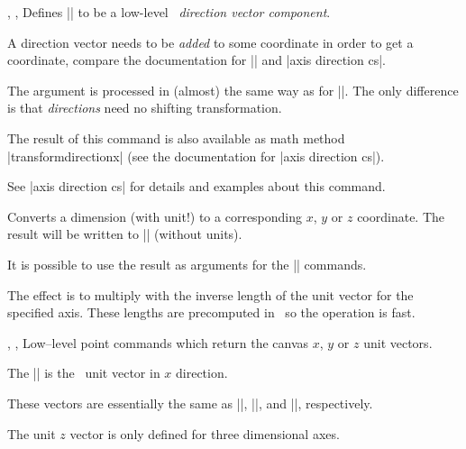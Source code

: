 \begin{commandlist}{%
	\pgfplotstransformdirectionx{},%
	\pgfplotstransformdirectiony{},%
	\pgfplotstransformdirectiony{}}
	Defines |\pgfmathresult| to be a low-level \PGF\ \emph{direction vector component}.

	A direction vector needs to be \emph{added} to some coordinate in order to get a coordinate, compare the documentation for |\pgfplotspointaxisdirectionxy| and |axis direction cs|.

	The argument  is processed in (almost) the same way as for |\pgfplotstransformcoordinatex|. The only difference is that \emph{directions} need no shifting transformation. 

	The result of this command is also available as math method |transformdirectionx| (see the documentation for |axis direction cs|).

	See |axis direction cs| for details and examples about this command.
\end{commandlist}

\begin{command}{\pgfplotsconvertunittocoordinate{}}
	Converts a dimension (with unit!) to a corresponding $x$, $y$ or $z$ coordinate. The result will be written to |\pgfmathresult| (without units).

	It is possible to use the result as arguments for the |\pgfpointxyz| commands.

	The effect is to multiply  with the inverse length of the unit vector for the specified axis. These lengths are precomputed in \PGFPlots\ so the operation is fast.
\begin{codeexample}
\end{codeexample}
\end{command}


\begin{commandlist}{%
	\pgfplotspointunitx,%
	\pgfplotspointunity,%
	\pgfplotspointunitz}%
	Low--level point commands which return the canvas $x$, $y$ or $z$ unit vectors.

	The |\pgfplotspointunitx| is the \pgfname\ unit vector in $x$ direction.

	These vectors are essentially the same as ||, ||, and ||, respectively.

	The unit $z$ vector is only defined for three dimensional axes.
\end{commandlist}

